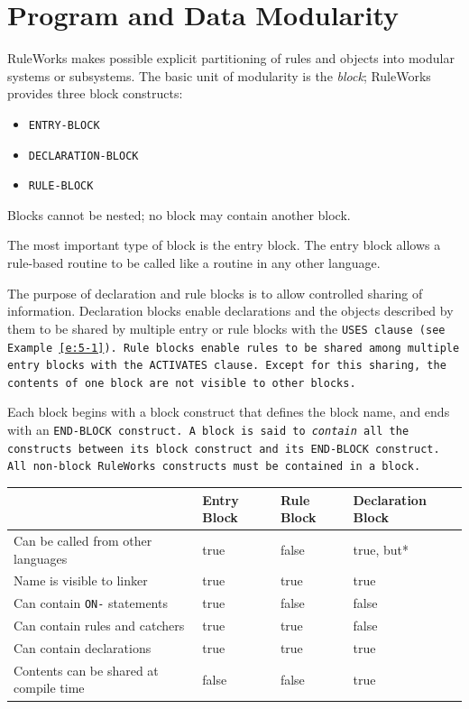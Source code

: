 \chapter{Program and Data Modularity}
\label{c:program}

RuleWorks makes possible explicit partitioning of rules and objects
into modular systems or subsystems. The basic unit of modularity is
the \emph{block}; RuleWorks provides three block constructs:

\begin{itemize}
\item\tt{ENTRY-BLOCK}
\item\tt{DECLARATION-BLOCK}
\item\tt{RULE-BLOCK}
\end{itemize}

\begin{note}
  Blocks cannot be nested; no block may contain another block.
\end{note}

The most important type of block is the entry block. The entry block
allows a rule-based routine to be called like a routine in any other
language.

The purpose of declaration and rule blocks is to allow controlled
sharing of information.  Declaration blocks enable declarations and
the objects described by them to be shared by multiple entry or rule
blocks with the \tt{USES} clause (see Example~\ref{e:5-1}). Rule
blocks enable rules to be shared among multiple entry blocks with the
\tt{ACTIVATES} clause. Except for this sharing, the contents of one
block are not visible to other blocks.

Each block begins with a block construct that defines the block name,
and ends with an \tt{END-BLOCK} construct. A block is said to
\emph{contain} all the constructs between its block construct and its
\tt{END-BLOCK} construct. All non-block RuleWorks constructs must be
contained in a block.

\begin{tabularx}{\columnwidth}{Xlll}
  \toprule
  & Entry Block & Rule Block & Declaration Block \\
  \midrule
  Can be called from other languages & true & false & true, but* \\
  Name is visible to linker & true & true & true \\
  Can contain \verb|ON-| statements & true & false & false \\
  Can contain rules and catchers & true & true & false \\
  Can contain declarations & true & true & true \\
  Contents can be shared at compile time & false & false & true \\
  \bottomrule
\end{tabularx}

